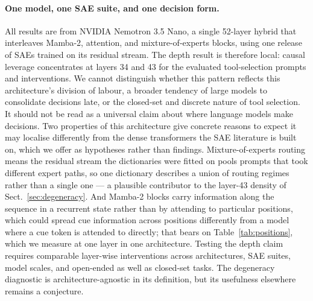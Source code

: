 \documentclass{article}
\begin{document}
\paragraph{One model, one SAE suite, and one decision form.} All results are from NVIDIA Nemotron 3.5 Nano, a single 52-layer hybrid that interleaves Mamba-2, attention, and mixture-of-experts blocks, using one release of SAEs trained on its residual stream. The depth result is therefore local: causal leverage concentrates at layers 34 and 43 for the evaluated tool-selection prompts and interventions. We cannot distinguish whether this pattern reflects this architecture's division of labour, a broader tendency of large models to consolidate decisions late, or the closed-set and discrete nature of tool selection. It should not be read as a universal claim about where language models make decisions. Two properties of this architecture give concrete reasons to expect it may localise differently from the dense transformers the SAE literature is built on, which we offer as hypotheses rather than findings. Mixture-of-experts routing means the residual stream the dictionaries were fitted on pools prompts that took different expert paths, so one dictionary describes a union of routing regimes rather than a single one --- a plausible contributor to the layer-43 density of Sect.~\ref{sec:degeneracy}. And Mamba-2 blocks carry information along the sequence in a recurrent state rather than by attending to particular positions, which could spread cue information across positions differently from a model where a cue token is attended to directly; that bears on Table~\ref{tab:positions}, which we measure at one layer in one architecture. Testing the depth claim requires comparable layer-wise interventions across architectures, SAE suites, model scales, and open-ended as well as closed-set tasks. The degeneracy diagnostic is architecture-agnostic in its definition, but its usefulness elsewhere remains a conjecture.
\end{document}
